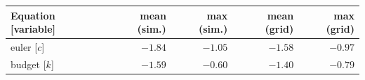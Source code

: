 \begin{tabular}{lrrrr}
\toprule
Equation [variable] & mean (sim.) & max (sim.) & mean (grid) & max (grid) \\
\midrule
euler [$c$] & $-1.84$ & $-1.05$ & $-1.58$ & $-0.97$ \\
budget [$k$] & $-1.59$ & $-0.60$ & $-1.40$ & $-0.79$ \\
\bottomrule
\end{tabular}
